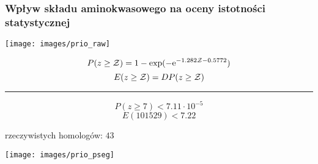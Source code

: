 \begin{frame}
\frametitle{\small Wpływ składu aminokwasowego
na oceny istotności statystycznej}

\begin{minipage}[c]{.3\textwidth}
\texttt{[image: images/prio\_raw]}
\end{minipage}\hspace{.01\textwidth}%
\begin{minipage}[c]{.38\textwidth}
\scriptsize

\[ P(z\ge{\cal{Z}}) = 1 -
  \exp(-\rm{e}^{-1.282{\cal{Z}} - 0.5772}) \]
\[ E(z\ge{\cal{Z}}) = DP(z\ge{\cal{Z}}) \]

\hrule

\[ P(z\ge7) < 7.11 \cdot 10^{-5} \]
\[ E(101529) < 7.22 \]

rzeczywistych homologów: $43$
\end{minipage}\hspace{.01\textwidth}%
\begin{minipage}[c]{.3\textwidth}
\texttt{[image: images/prio\_pseg]}
\end{minipage}


\end{frame}
